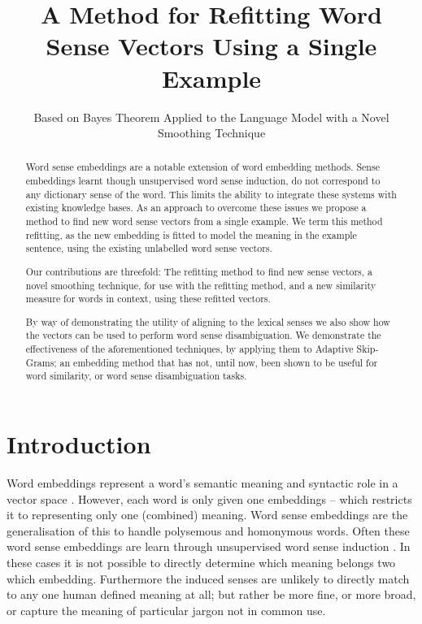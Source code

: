 \documentclass{sig-alternate}
\begin{document}
\title{A Method for Refitting Word Sense Vectors Using a Single Example}
\subtitle{Based on Bayes Theorem Applied to the Language Model with a Novel Smoothing Technique}
\maketitle

\begin{abstract}
Word sense embeddings are a notable extension of word embedding methods.
Sense embeddings learnt though unsupervised word sense induction, do not correspond to any dictionary sense of the word.
This limits the ability to integrate these systems with existing knowledge bases.
As an approach to overcome these issues we propose a method to find new word sense vectors from a single example.
We term this method refitting, as the new embedding is fitted to model the meaning in the example sentence, using the existing unlabelled word sense vectors.

Our contributions are threefold:
The refitting method to find new sense vectors,
a novel smoothing technique, for use with the refitting method,
and a new similarity measure for words in context, using these refitted vectors.

By way of demonstrating the utility of aligning to the lexical senses we also show how the vectors can be used to perform word sense disambiguation.
We demonstrate the effectiveness of the aforementioned techniques, by applying them to Adaptive Skip-Grams;
an embedding method that has not, until now, been shown to be useful for word similarity, or  word sense disambiguation tasks. 
\end{abstract}

\section{Introduction}


Word embeddings represent a word's semantic meaning and syntactic role in a vector space \parencite{NPLM, collobert2008unified, mikolov2013efficient}. However, each word is only given one embeddings -- which restricts it to representing only one (combined) meaning. Word sense embeddings are the generalisation of this to handle polysemous and homonymous  words. Often these word sense embeddings are learn through unsupervised word sense induction \parencite{Reisinger2010,Huang2012,tian2014probabilistic, AdaGrams}. In these cases it is not possible to directly determine which meaning belongs two which embedding. Furthermore the induced senses are unlikely to directly match to any one human defined meaning at all; but rather be more fine, or more broad, or capture the meaning of particular jargon not in common use.
\end{document}
